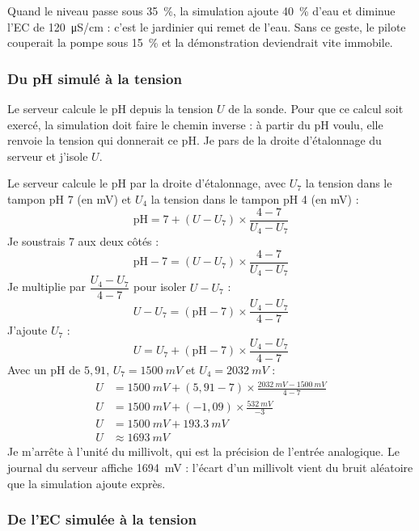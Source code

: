Quand le niveau passe sous \qty{35}{\percent}, la simulation ajoute \qty{40}{\percent} d'eau et diminue l'EC de \qty{120}{\micro S/cm} : c'est le jardinier qui remet de l'eau. Sans ce geste, le pilote couperait la pompe sous \qty{15}{\percent} et la démonstration deviendrait vite immobile.

\subsubsection*{Du pH simulé à la tension}

Le serveur calcule le pH depuis la tension $U$ de la sonde. Pour que ce calcul soit exercé, la simulation doit faire le chemin inverse : à partir du pH voulu, elle renvoie la tension qui donnerait ce pH. Je pars de la droite d'étalonnage du serveur et j'isole $U$.

\begin{demonstration}
Le serveur calcule le pH par la droite d'étalonnage, avec $U_7$ la tension dans le tampon pH 7 (en mV) et $U_4$ la tension dans le tampon pH 4 (en mV) :
\[
\mathrm{pH} = 7 + (U - U_7)\times\frac{4 - 7}{U_4 - U_7}
\]
Je soustrais 7 aux deux côtés :
\[
\mathrm{pH} - 7 = (U - U_7)\times\frac{4 - 7}{U_4 - U_7}
\]
Je multiplie par $\dfrac{U_4 - U_7}{4 - 7}$ pour isoler $U - U_7$ :
\[
U - U_7 = (\mathrm{pH} - 7)\times\frac{U_4 - U_7}{4 - 7}
\]
J'ajoute $U_7$ :
\[
U = U_7 + (\mathrm{pH} - 7)\times\frac{U_4 - U_7}{4 - 7}
\]
Avec un pH de $5{,}91$, $U_7 = \qty{1500}{mV}$ et $U_4 = \qty{2032}{mV}$ :
\begin{align*}
U &= \qty{1500}{mV} + (5{,}91 - 7)\times\frac{\qty{2032}{mV} - \qty{1500}{mV}}{4 - 7}\\
U &= \qty{1500}{mV} + (-1{,}09)\times\frac{\qty{532}{mV}}{-3}\\
U &= \qty{1500}{mV} + \qty{193,3}{mV}\\
U &\approx \qty{1693}{mV}
\end{align*}
Je m'arrête à l'unité du millivolt, qui est la précision de l'entrée analogique. Le journal du serveur affiche \qty{1694}{mV} : l'écart d'un millivolt vient du bruit aléatoire que la simulation ajoute exprès.
\end{demonstration}

\subsubsection*{De l'EC simulée à la tension}

